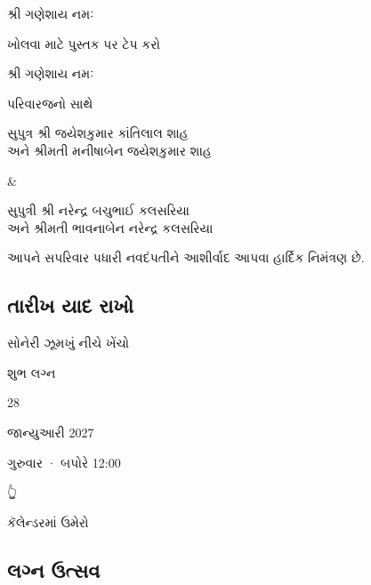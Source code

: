 \label{st}
\label{ld}

\label{bw}
\label{bk}
\label{pg}

\label{cv}
\textbar\textbar{} શ્રી ગણેશાય નમઃ \textbar\textbar{}

ખોલવા માટે પુસ્તક પર ટેપ કરો

\label{fx}

\label{dc}
\label{pb}

\label{inv}
\label{p1}
\textbar\textbar{} શ્રી ગણેશાય નમઃ \textbar\textbar{}

પરિવારજનો સાથે

\label{n1}

સુપુત્ર શ્રી જયેશકુમાર કાંતિલાલ શાહ\\
અને શ્રીમતી મનીષાબેન જયેશકુમાર શાહ

\&

\label{n2}

સુપુત્રી શ્રી નરેન્દ્ર બચુભાઈ કલસરિયા\\
અને શ્રીમતી ભાવનાબેન નરેન્દ્ર કલસરિયા

આપને સપરિવાર પધારી નવદંપતીને આશીર્વાદ આપવા હાર્દિક નિમંત્રણ છે.

\label{s2}
\subsection{તારીખ યાદ રાખો}\label{uxaa4uxab0uxa96-uxaafuxaa6-uxab0uxa96}

\label{sd}
\label{ht}
સોનેરી ઝૂમખું નીચે ખેંચો

\label{pp}
શુભ લગ્ન

28

જાન્યુઆરી 2027

ગુરુવાર · બપોરે 12:00

\label{rl}

\label{ts}

\label{fg}
👆

\label{cd}

\label{cal}{કૅલેન્ડરમાં ઉમેરો}

\label{s3}
\subsection{લગ્ન ઉત્સવ}\label{uxab2uxa97uxaa8-uxa89uxaa4uxab8uxab5}


